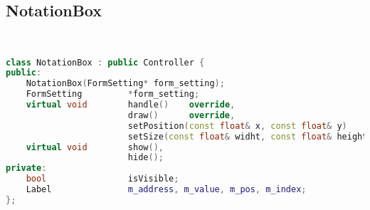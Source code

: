 \subsection{NotationBox}
\begin{lstlisting}[language=C++]


class NotationBox : public Controller {
public:
    NotationBox(FormSetting* form_setting);
    FormSetting         *form_setting;
    virtual void        handle()    override,
                        draw()      override,
                        setPosition(const float& x, const float& y)         override,
                        setSize(const float& widht, const float& height)    override;
    virtual void        show(),
                        hide();
private:
    bool                isVisible;
    Label               m_address, m_value, m_pos, m_index;
};





\end{lstlisting}
